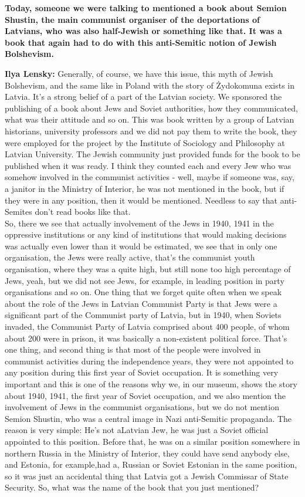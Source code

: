 \textbf{Today, someone we were talking to mentioned a book about Semion Shustin, the main communist organiser of the deportations of Latvians, who was also half-Jewish or something like that. It was a book that again had to do with this anti-Semitic notion of Jewish Bolshevism.} 

\textbf{Ilya Lensky:} Generally, of course, we have this issue, this myth of Jewish Bolshevism, and the same like in Poland with the story of Żydokomuna exists in Latvia. It’s a strong belief of a part of the Latvian society. We sponsored the publishing of a book about Jews and Soviet authorities, how they communicated, what was their attitude and so on. This was book written by a group of Latvian historians, university professors and we did not pay them to write the book, they were employed for the project by the Institute of Sociology and Philosophy at Latvian University. The Jewish community just provided funds for the book to be published when it was ready. I think they counted each and every Jew who was somehow involved in the communist activities - well, maybe if someone was, say, a janitor in the Ministry of Interior, he was not mentioned in the book, but if they were in any position, then it would be mentioned. Needless to say that anti-Semites don’t read books like that.\\
So, there we see that actually involvement of the Jews in 1940, 1941 in the oppressive institutions or any kind of institutions that would making decisions was actually even lower than it would be estimated, we see that in only one organisation, the Jews were really active, that’s the communist youth organisation, where they was a quite high, but still none too high percentage of Jews, yeah, but we did not see Jews, for example, in leading position in party organisations and so on. One thing that we forget quite often when we speak about the role of the Jews in Latvian Communist Party is that Jews were  a significant part of the Communist party of Latvia, but in 1940, when Soviets invaded, the Communist Party of Latvia comprised about 400 people, of whom about 200 were in prison, it was basically a non-existent political force. That’s one thing, and second thing is that most of the people were involved in communist activities during the independence years, they were not appointed to any position during this first year of Soviet occupation. It is something very important and this is one of the reasons why we, in our museum, shows the story about 1940, 1941, the first year of Soviet occupation, and we also mention the involvement of Jews in the communist organisations, but we do not mention Semion Shustin, who was a central image in Nazi anti-Semitic propaganda. The reason is very simple: He’s not  aLatvian Jew, he was just a Soviet official appointed to this position. Before that, he was on a similar position somewhere in northern Russia in the Ministry of Interior, they could have send anybody else, and Estonia, for example,had a, Russian or Soviet Estonian in the same position, so it was just an accidental thing that Latvia got a Jewish Commissar of State Security. So,  what was the name of the book that you just mentioned? 

